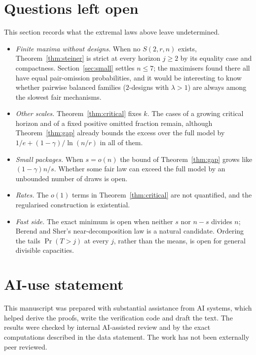 \documentclass[11pt,a4paper]{article}
\theoremstyle{remark}
\begin{document}
\section{Questions left open}
\label{sec:open}
This section records what the extremal laws above leave undetermined.
\begin{itemize}
\item \emph{Finite maxima without designs.} When no $S(2,r,n)$ exists, Theorem~\ref{thm:steiner} is strict at every horizon $j\ge2$ by its equality case and compactness. Section~\ref{sec:small} settles $n\le7$; the maximisers found there all have equal pair-omission probabilities, and it would be interesting to know whether pairwise balanced families ($2$-designs with $\lambda>1$) are always among the slowest fair mechanisms.
\item \emph{Other scales.} Theorem~\ref{thm:critical} fixes $k$. The cases of a growing critical horizon and of a fixed positive omitted fraction remain, although Theorem~\ref{thm:gap} already bounds the excess over the full model by $1/e+(1-\gamma)/\ln(n/r)$ in all of them.
\item \emph{Small packages.} When $s=o(n)$ the bound of Theorem~\ref{thm:gap} grows like $(1-\gamma)n/s$. Whether some fair law can exceed the full model by an unbounded number of draws is open.
\item \emph{Rates.} The $o(1)$ terms in Theorem~\ref{thm:critical} are not quantified, and the regularised construction is existential.
\item \emph{Fast side.} The exact minimum is open when neither $s$ nor $n-s$ divides $n$; Berend and Sher's near-decomposition law is a natural candidate. Ordering the tails $\Pr(T>j)$ at every $j$, rather than the means, is open for general divisible capacities.
\end{itemize}

\section*{AI-use statement}
This manuscript was prepared with substantial assistance from AI systems, which helped derive the proofs, write the verification code and draft the text. The results were checked by internal AI-assisted review and by the exact computations described in the data statement. The work has not been externally peer reviewed.
\end{document}
